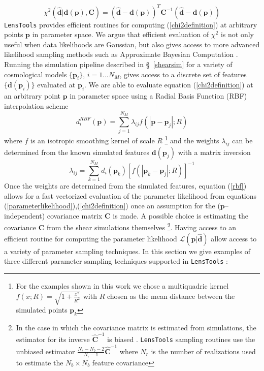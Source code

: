 \documentclass[5p]{elsarticle}
\newcommand{\bb}[1]{\mathbf{#1}}
\newcommand{\bbh}[1]{\mathbf{\hat{#1}}}
\newcommand{\LT}{\texttt{LensTools} }
\begin{document}
\begin{equation}
\label{chi2definition}
\chi^2\left(\bbh{d}\vert\bb{d}(\bb{p}),\bb{C}\right) = (\bbh{d}-\bb{d}(\bb{p}))^T\bb{C}^{-1}(\bbh{d}-\bb{d}(\bb{p}))
\end{equation}
%
\LT provides efficient routines for computing (\ref{chi2definition}) at arbitrary points $\bb{p}$ in parameter space. We argue that efficient evaluation of $\chi^2$ is not only useful when data likelihoods are Gaussian, but also gives access to more advanced likelihood sampling methods such as Approximate Bayesian Computation \citep{cosmoabc}.  
Running the simulation pipeline described in \S~\ref{shearsim} for a variety of cosmological models $\{\bb{p}_i\}$, $i=1...N_M$, gives access to a discrete set of features $\{\bb{d}(\bb{p}_i)\}$ evaluated at $\bb{p}_i$. We are able to evaluate equation (\ref{chi2definition}) at an arbitrary point $\bb{p}$ in parameter space using a Radial Basis Function (RBF) interpolation scheme 
\begin{equation}
\label{rbf}
d^{RBF}_i(\bb{p}) = \sum_{j=1}^{N_M}\lambda_{ij} f\left(\left\vert\bb{p}-\bb{p}_j\right\vert;R\right)
\end{equation} 
%
where $f$ is an isotropic smoothing kernel of scale $R$ \footnote{For the examples shown in this work we chose a multiquadric kernel $f(x;R)=\sqrt{1+\frac{x^2}{R^2}}$ with $R$ chosen as the mean distance between the simulated points $\bb{p}_k$} and the weights $\lambda_{ij}$ can be determined from the known simulated features $\bb{d}(\bb{p}_j)$ with a matrix inversion
\begin{equation}
\lambda_{ij} = \sum_{k=1}^{N_M}d_i(\bb{p}_k)\left[f\left(\left\vert\bb{p}_k-\bb{p}_j\right\vert;R\right)\right]^{-1}
\end{equation}
%
Once the weights are determined from the simulated features, equation (\ref{rbf}) allows for a fast vectorized evaluation of the parameter likelihood from equations (\ref{parameterlikelihood}),(\ref{chi2definition}) once an assumption for the ($\bb{p}$--independent) covariance matrix $\bb{C}$ is made. A possible choice is estimating the covariance $\bb{C}$ from the shear simulations themselves \footnote{In the case in which the covariance matrix is estimated from simulations, the estimator for its inverse $\bbh{C}^{-1}$ is biased \citep{Taylor12}. \LT sampling routines use the unbiased estimator $\frac{N_r-N_b-2}{N_r-1}\bbh{C}^{-1}$ where $N_r$ is the number of realizations used to estimate the $N_b\times N_b$ feature covariance}. Having access to an efficient routine for computing the parameter likelihood $\mathcal{L}(\bb{p}\vert\bbh{d})$ allow access to a variety of parameter sampling techniques. In this section we give examples of three different parameter sampling techniques supported in \LT:
\end{document}
